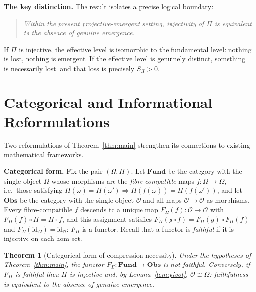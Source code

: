 \documentclass[12pt,a4paper]{article}
\newtheorem{theorem}{Theorem}
\begin{document}
  \textbf{The key distinction.}
  The result isolates a precise logical boundary:

  \begin{quote}
    \emph{Within the present projective-emergent setting,
      injectivity of $\Pi$ is equivalent to the absence of genuine emergence.}
  \end{quote}

  If $\Pi$ is injective, the effective level is isomorphic to the fundamental
  level: nothing is lost, nothing is emergent.
  If the effective level is genuinely distinct, something is necessarily lost, and
  that loss is precisely $S_\Pi > 0$.

  \section{Categorical and Informational Reformulations}
  \label{sec:cat-info}

  Two reformulations of Theorem~\ref{thm:main} strengthen its connections to
  existing mathematical frameworks.

  \textbf{Categorical form.}
  Fix the pair $(\Omega, \Pi)$.
  Let $\mathbf{Fund}$ be the category with the single object $\Omega$ whose morphisms are the
  \emph{fibre-compatible} maps $f : \Omega \to \Omega$, i.e.\ those satisfying
  $\Pi(\omega) = \Pi(\omega') \Rightarrow \Pi(f(\omega)) = \Pi(f(\omega'))$, and let $\mathbf{Obs}$ be the
  category with the single object $\mathcal{O}$ and all maps $\mathcal{O} \to \mathcal{O}$ as morphisms.
  Every fibre-compatible $f$ descends to a unique map $F_\Pi(f) : \mathcal{O} \to \mathcal{O}$ with
  $F_\Pi(f) \circ \Pi = \Pi \circ f$, and this assignment satisfies
  $F_\Pi(g \circ f) = F_\Pi(g) \circ F_\Pi(f)$ and $F_\Pi(\mathrm{id}_\Omega) = \mathrm{id}_{\mathcal{O}}$:
  $F_\Pi$ is a functor.
  Recall that a functor is \emph{faithful} if it is injective on each hom-set.

  \begin{theorem}[Categorical form of compression necessity]
    \label{thm:cat}
    Under the hypotheses of Theorem~\ref{thm:main}, the functor
    $F_\Pi : \mathbf{Fund} \to \mathbf{Obs}$ is not faithful.
    Conversely, if $F_\Pi$ is faithful then $\Pi$ is injective and, by Lemma~\ref{lem:pivot},
    $\mathcal{O} \cong \Omega$: faithfulness is equivalent to the absence of genuine emergence.
  \end{theorem}
\end{document}

